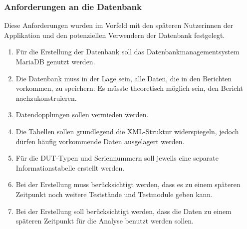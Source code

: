 \subsubsection{Anforderungen an die Datenbank}

Diese Anforderungen wurden im Vorfeld mit den späteren Nutzerinnen der Applikation und den potenziellen Verwendern der Datenbank festgelegt.

\begin{enumerate}
\item Für die Erstellung der Datenbank soll das Datenbankmanagementsystem MariaDB genutzt werden.


\item Die Datenbank muss in der Lage sein, alle Daten, die in den Berichten vorkommen, zu speichern. Es müsste theoretisch möglich sein, den Bericht nachzukonstruieren.


\item Datendopplungen sollen vermieden werden.


\item Die Tabellen sollen grundlegend die \ac{XML}-Struktur widerspiegeln, jedoch dürfen häufig vorkommende Daten ausgelagert werden.


\item Für die DUT-Typen und Seriennummern soll jeweils eine separate Informationstabelle erstellt werden.


\item Bei der Erstellung muss berücksichtigt werden, dass es zu einem späteren Zeitpunkt noch weitere Teststände und Testmodule geben kann.


\item Bei der Erstellung soll berücksichtigt werden, dass die Daten zu einem späteren Zeitpunkt für die Analyse benutzt werden sollen.


\end{enumerate}